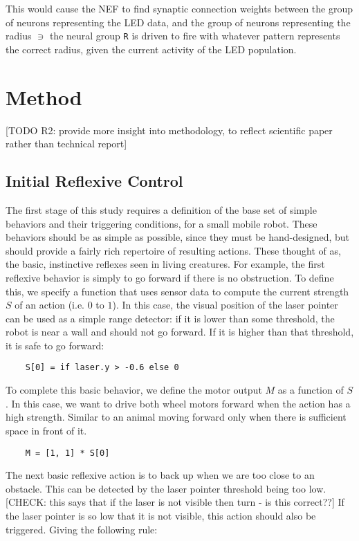 \documentclass[conference]{IEEEtran}
\begin{document}
This would cause the NEF to find synaptic connection weights between the group of neurons representing the LED data, and the group of neurons representing the radius $\ni$ the neural group \texttt{R} is driven to fire with whatever pattern represents the correct radius, given the current activity of the LED population. 

\section{Method}
[TODO R2: provide more insight into methodology, to reflect scientific paper rather than technical report]

\subsection{Initial Reflexive Control}
The first stage of this study requires a definition of the base set of simple behaviors and their triggering conditions, for a small mobile robot. These behaviors should be as simple as possible, since they must be hand-designed, but should provide a fairly rich repertoire of resulting actions. These thought of as, the basic, instinctive reflexes seen in living creatures. For example, the first reflexive behavior is simply to go forward if there is no obstruction. To define this, we specify a function that uses sensor data to compute the current strength $S$ of an action (i.e. $0$ to $1$). In this case, the visual position of the laser pointer can be used as a simple range detector: if it is lower than some threshold, the robot is near a wall and should not go forward. If it is higher than that threshold, it is safe to go forward: 
\begin{lstlisting}
	S[0] = if laser.y > -0.6 else 0
\end{lstlisting}
To complete this basic behavior, we define the motor output $M$ as a function of $S$. In this case, we want to drive both wheel motors forward when the action has a high strength. Similar to an animal moving forward only when there is sufficient space in front of it.
\begin{lstlisting}
	M = [1, 1] * S[0]
\end{lstlisting}
The next basic reflexive action is to back up when we are too close to an obstacle. This can be detected by the laser pointer threshold being too low. [CHECK: this says that if the laser is not visible then turn - is this correct??] If the laser pointer is so low that it is not visible, this action should also be triggered. Giving the following rule:
\end{document}
